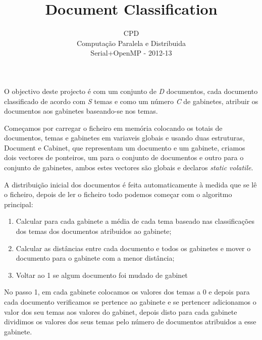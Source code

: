 \documentclass[times, 10pt,twocolumn]{article}
\begin{document}
 \title{Document Classification}

 \author{CPD\\
 Computação Paralela e Distribuida\\
 Serial+OpenMP - 2012-13
}
	   
\maketitle
\thispagestyle{empty}


O objectivo deste projecto é com um conjunto de \emph{D} documentos, cada documento classificado de acordo com \emph{S} temas e como um número \emph{C} de gabinetes, atribuir os documentos aos gabinetes baseando-se nos temas.


Começamos por carregar o ficheiro em memória colocando os totais de documentos, temas e gabinetes em variaveis globais e usando duas estruturas, Document e Cabinet, que representam um documento e um gabinete, criamos dois vectores de ponteiros, um para o conjunto de documentos e outro para o conjunto de gabinetes, ambos estes vectores são globais e declaros \emph{static volatile}.

A distribuição inicial dos documentos é feita automaticamente à medida que se lê o ficheiro, depois de ler o ficheiro todo podemos começar com o algoritmo principal:

\begin{enumerate}
\item Calcular para cada gabinete a média de cada tema baseado nas classificações dos temas dos documentos atribuidos ao gabinete;
\item Calcular as distâncias entre cada documento e todos os gabinetes e mover o documento para o gabinete com a menor distância;
\item Voltar ao 1 se algum documento foi mudado de gabinet
\end{enumerate}

No passo 1, em cada gabinete colocamos os valores dos temas a 0 e depois para cada documento verificamos se pertence ao gabinete e se pertencer adicionamos o valor dos seu temas aos valores do gabinet, depois disto para cada gabinete dividimos os valores dos seus temas pelo número de documentos atribuidos a esse gabinete.
\end{document}
